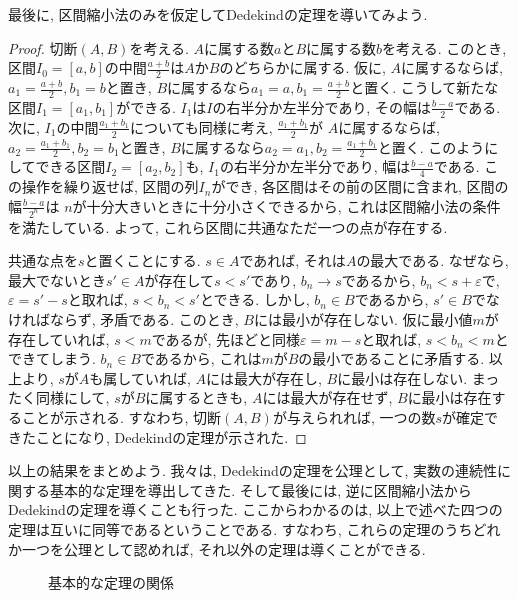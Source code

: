 \documentclass[a4j,dvipdfmx]{jsarticle}
\numberwithin{equation}{section}
\begin{document}
            最後に, 区間縮小法のみを仮定してDedekindの定理を導いてみよう.
            \begin{proof}
                切断$(A,B)$を考える. $A$に属する数$a$と$B$に属する数$b$を考える. このとき, 区間$I_0=[a,b]$の中間$\frac{a+b}{2}$は$A$か$B$のどちらかに属する.
                仮に, $A$に属するならば, $a_1=\frac{a+b}{2},b_1=b$と置き, $B$に属するなら$a_1=a,b_1=\frac{a+b}{2}$と置く. こうして新たな区間$I_1=[a_1,b_1]$ができる.
                $I_1$は$I$の右半分か左半分であり, その幅は$\frac{b-a}{2}$である. 次に, $I_1$の中間$\frac{a_1+b_1}{2}$についても同様に考え, $\frac{a_1+b_1}{2}$が
                $A$に属するならば, $a_2=\frac{a_1+b_1}{2},b_2=b_1$と置き, $B$に属するなら$a_2=a_1,b_2=\frac{a_1+b_1}{2}$と置く. このようにしてできる区間$I_2=[a_2,b_2]$も, 
                $I_1$の右半分か左半分であり, 幅は$\frac{b-a}{4}$である. この操作を繰り返せば, 区間の列$I_n$ができ, 各区間はその前の区間に含まれ, 区間の幅$\frac{b-a}{2^n}$は
                $n$が十分大きいときに十分小さくできるから, これは区間縮小法の条件を満たしている. よって, これら区間に共通なただ一つの点が存在する. 
                
                共通な点を$s$と置くことにする. $s\in A$であれば, それは$A$の最大である. なぜなら, 最大でないとき$s'\in A$が存在して$s<s'$であり, $b_n\rightarrow s$であるから, $b_n<s+\varepsilon$で, $\varepsilon=s'-s$と取れば, 
                $s<b_n<s'$とできる. しかし, $b_n\in B$であるから, $s'\in B$でなければならず, 矛盾である. このとき, $B$には最小が存在しない.
                仮に最小値$m$が存在していれば, $s<m$であるが, 先ほどと同様$\varepsilon=m-s$と取れば, $s<b_n<m$とできてしまう. $b_n\in B$であるから, これは$m$が$B$の最小であることに矛盾する.
                以上より, $s$が$A$も属していれば, $A$には最大が存在し, $B$に最小は存在しない. まったく同様にして, $s$が$B$に属するときも, $A$には最大が存在せず, $B$に最小は存在することが示される.
                すなわち, 切断$(A,B)$が与えられれば, 一つの数$s$が確定できたことになり, Dedekindの定理が示された. 
            \end{proof}
            \clearpage
            以上の結果をまとめよう. 我々は, Dedekindの定理を公理として, 実数の連続性に関する基本的な定理を導出してきた. そして最後には, 逆に区間縮小法からDedekindの定理を導くことも行った.
            ここからわかるのは, 以上で述べた四つの定理は互いに同等であるということである. すなわち, これらの定理のうちどれか一つを公理として認めれば, それ以外の定理は導くことができる.

            \begin{figure}[h]
                \centering
                \caption{基本的な定理の関係}
            \end{figure}
\end{document}
